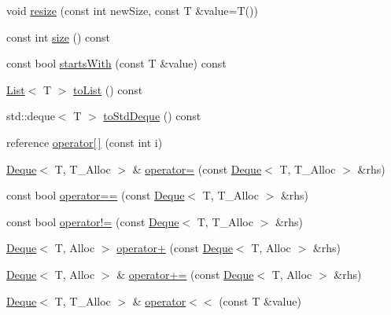 \begin{DoxyCompactItemize}
\item 
void \hyperlink{namespaceprism_a7236cdb4e2661bd63c2fe4ee5c3452f9}{resize} (const int new\+Size, const T \&value=T())
\item 
const int \hyperlink{namespaceprism_acd3c0f96adf158a29387191d79c4d874}{size} () const 
\item 
const bool \hyperlink{namespaceprism_a92e90ca54b9fa627213076f93d44ca2d}{starts\+With} (const T \&value) const 
\item 
\hyperlink{classprism_1_1_list}{List}$<$ T $>$ \hyperlink{namespaceprism_a07654e91e7474a3ccdcd95bb5e57baea}{to\+List} () const 
\item 
std\+::deque$<$ T $>$ \hyperlink{namespaceprism_a770640a1fe99095d96e9295b225ac93d}{to\+Std\+Deque} () const 
\item 
reference \hyperlink{namespaceprism_ae5cdc796ecf7df67ce6377bfe9eadb7c}{operator\mbox{[}$\,$\mbox{]}} (const int i)
\item 
\hyperlink{namespaceprism_a8e77ed12f9b3a35d81935362d3050d0c}{Deque}$<$ T, T\+\_\+\+Alloc $>$ \& \hyperlink{namespaceprism_ab5a3ba3d60ef11974d02f7941fa9a263}{operator=} (const \hyperlink{namespaceprism_a8e77ed12f9b3a35d81935362d3050d0c}{Deque}$<$ T, T\+\_\+\+Alloc $>$ \&rhs)
\item 
const bool \hyperlink{namespaceprism_a47eb78b48fe05bc2087a1c5e70f4c373}{operator==} (const \hyperlink{namespaceprism_a8e77ed12f9b3a35d81935362d3050d0c}{Deque}$<$ T, T\+\_\+\+Alloc $>$ \&rhs)
\item 
const bool \hyperlink{namespaceprism_a7410d6cd07f48e8495d2ac7196b2e609}{operator!=} (const \hyperlink{namespaceprism_a8e77ed12f9b3a35d81935362d3050d0c}{Deque}$<$ T, T\+\_\+\+Alloc $>$ \&rhs)
\item 
\hyperlink{namespaceprism_a8e77ed12f9b3a35d81935362d3050d0c}{Deque}$<$ T, Alloc $>$ \hyperlink{namespaceprism_a769b9ece349795edbfeb8e33cbf276e5}{operator+} (const \hyperlink{namespaceprism_a8e77ed12f9b3a35d81935362d3050d0c}{Deque}$<$ T, Alloc $>$ \&rhs)
\item 
\hyperlink{namespaceprism_a8e77ed12f9b3a35d81935362d3050d0c}{Deque}$<$ T, Alloc $>$ \& \hyperlink{namespaceprism_a1619579754dfe66f3fe3559f2e4495e5}{operator+=} (const \hyperlink{namespaceprism_a8e77ed12f9b3a35d81935362d3050d0c}{Deque}$<$ T, Alloc $>$ \&rhs)
\item 
\hyperlink{namespaceprism_a8e77ed12f9b3a35d81935362d3050d0c}{Deque}$<$ T, T\+\_\+\+Alloc $>$ \& \hyperlink{namespaceprism_a40203d2e776fe0acf317a98ef08f8be7}{operator$<$$<$} (const T \&value)
\item 

\end{DoxyCompactItemize}
